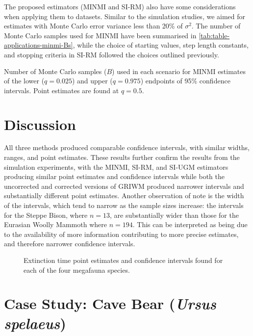 The proposed estimators (MINMI and SI-RM) also have some considerations when applying them to datasets. Similar to the simulation studies, we aimed for estimates with Monte Carlo error variance less than 20\% of $\sigma^2$. The number of Monte Carlo samples used for MINMI have been summarised in \autoref{tab:table-applications-minmi-Bs}, while the choice of starting values, step length constants, and stopping criteria in SI-RM followed the choices outlined previously.
\begin{table}[ht]
    \centering
    \caption{Number of Monte Carlo samples ($B$) used in each scenario for MINMI estimates of the lower ($q=0.025$) and upper ($q=0.975$) endpoints of 95\% confidence intervals. Point estimates are found at $q = 0.5$.}
    \vspace{4mm}
    
    \label{tab:table-applications-minmi-Bs}
\end{table}

\section{Discussion}
All three methods produced comparable confidence intervals, with similar widths, ranges, and point estimates. These results further confirm the results from the simulation experiments, with the MINMI, SI-RM, and SI-UGM estimators producing similar point estimates and confidence intervals while both the uncorrected and corrected versions of GRIWM produced narrower intervals and substantially different point estimates. Another observation of note is the width of the intervals, which tend to narrow as the sample sizes increase: the intervals for the Steppe Bison, where $n = 13$, are substantially wider than those for the Eurasian Woolly Mammoth where $n = 194$. This can be interpreted as being due to the availability of more information contributing to more precise estimates, and therefore narrower confidence intervals.
\begin{figure}[ht]
    \centering
    
    \caption{Extinction time point estimates and confidence intervals found for each of the four megafauna species.}
    \label{fig:applications-confidence-intervals}
\end{figure}
\clearpage
\section{Case Study: Cave Bear (\textit{Ursus spelaeus})}

